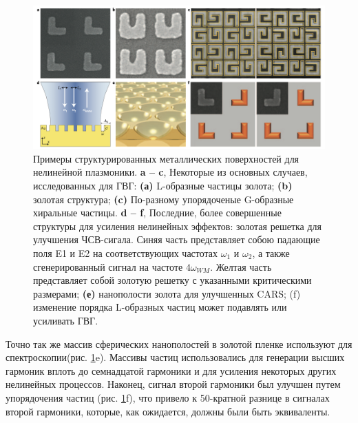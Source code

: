 \begin{figure}[h!]
	\centering
	\includegraphics[width=0.9\linewidth]{images/mettals.png}
	\caption{Примеры структурированных металлических поверхностей для нелинейной плазмоники. \textbf{a – c}, Некоторые из основных случаев, исследованных для ГВГ: \textbf{(а)} L-образные частицы золота; \textbf{(b) }золотая структура; \textbf{(c)} По-разному упорядоченые G-образные хиральные частицы. \textbf{d – f},  Последние, более совершенные структуры для усиления нелинейных эффектов: золотая решетка для улучшения ЧСВ-сигала. Синяя часть представляет собою падающие поля E1 и E2 на соответствующих частотах $\omega_1$ и $\omega_2$, а также сгенерированный сигнал на частоте $4\omega_{WM}$. Желтая часть представляет собой золотую решетку с указанными критическими размерами; \textbf{(е) }нанополости золота для улучшенных CARS; (f) изменение порядка L-образных частиц может подавлять или усиливать ГВГ.}
	\label{mettals}
\end{figure}

\hspace*{2mm}
Точно так же массив сферических нанополостей в золотой пленке используют для спектроскопии(рис. \ref{mettals}e). Массивы частиц использовались для генерации высших гармоник вплоть до семнадцатой гармоники \cite{kim2008high} и для усиления некоторых других нелинейных процессов. Наконец, сигнал второй гармоники  был улучшен путем упорядочения частиц (рис. \ref{mettals}f), что привело к 50-кратной разнице в сигналах второй гармоники, которые, как ожидается, должны были быть эквиваленты.

